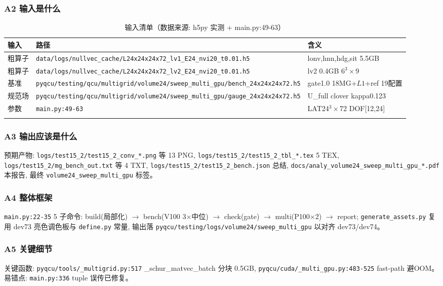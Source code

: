 \documentclass[UTF8]{ctexart}
\begin{document}
\subsubsection{A2 输入是什么}
\begin{xltabular}{\textwidth}{lXl}
\toprule
输入 & 路径 & 含义 \\
\midrule
\endhead
粗算子 & \texttt{\nolinkurl{data/logs/nullvec_cache/L24x24x24x72_lv1_E24_nvi20_t0.01.h5}} & lonv,hnn,hdg,sit 5.5GB \\
粗算子 & \texttt{\nolinkurl{data/logs/nullvec_cache/L24x24x24x72_lv2_E24_nvi20_t0.01.h5}} & lv2 0.4GB 6$^3\times$9 \\
基准 & \texttt{\nolinkurl{pyqcu/testing/qcu/multigrid/volume24/sweep_multi_gpu/bench_24x24x24x72.h5}} & gate1.0 18MG+$L1$+ref 19配置 \\
规范场 & \texttt{\nolinkurl{pyqcu/testing/qcu/multigrid/volume24/sweep_multi_gpu/gauge_24x24x24x72.h5}} & U\_full clover kappa0.123 \\
参数 & \texttt{\nolinkurl{main.py:49-63}} & LAT24$^3\times$72 DOF[12,24] \\
\bottomrule
\caption{输入清单（数据来源: h5py 实测 + main.py:49-63）}
\end{xltabular}

\subsubsection{A3 输出应该是什么}
预期产物: \texttt{\nolinkurl{logs/test15_2/test15_2_conv_*.png}} 等 13 PNG, \texttt{\nolinkurl{logs/test15_2/test15_2_tbl_*.tex}} 5 TEX, \texttt{\nolinkurl{logs/test15_2/mg_bench_out.txt}} 等 4 TXT, \texttt{\nolinkurl{logs/test15_2/test15_2_bench.json}} 总结, \texttt{\nolinkurl{docs/analy_volume24_sweep_multi_gpu_*.pdf}} 本报告, 最终 \texttt{\nolinkurl{volume24_sweep_multi_gpu}} 标签。

\subsubsection{A4 整体框架}
\texttt{\nolinkurl{main.py:22-35}} 5 子命令: build(局部化) $\to$ bench(V100 3$\times$中位) $\to$ check(gate) $\to$ multi(P100$\times$2) $\to$ report; \texttt{\nolinkurl{generate_assets.py}} 复用 dev73 亮色调色板与 \texttt{\nolinkurl{define.py}} 常量, 输出落 \texttt{\nolinkurl{pyqcu/testing/logs/volume24/sweep_multi_gpu}} 以对齐 dev73/dev74。

\subsubsection{A5 关键细节}
关键函数: \texttt{\nolinkurl{pyqcu/tools/_multigrid.py:517}} \_schur\_matvec\_batch 分块 0.5GB, \texttt{\nolinkurl{pyqcu/cuda/_multi_gpu.py:483-525}} fast-path 避OOM。易错点: \texttt{\nolinkurl{main.py:336}} tuple 误传已修复。

\end{document}

